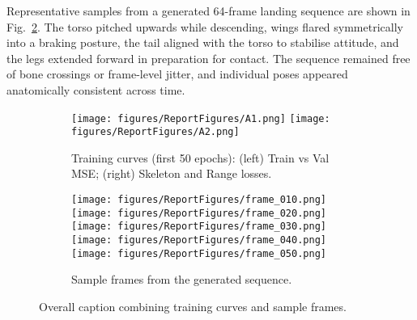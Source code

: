 \documentclass[final-report]{report-template}
\begin{document}
Representative samples from a generated 64-frame landing sequence are shown in Fig.~\ref{fig:bottom_five}. 
The torso pitched upwards while descending, wings flared symmetrically into a braking posture, the tail aligned with the torso to stabilise attitude, and the legs extended forward in preparation for contact. 
The sequence remained free of bone crossings or frame-level jitter, and individual poses appeared anatomically consistent across time.



\begin{figure}[H]
\centering

  \begin{subfigure}[t]{0.95\textwidth}
    \centering
    \texttt{[image: figures/ReportFigures/A1.png]}
    \hfill
    \texttt{[image: figures/ReportFigures/A2.png]}
    \caption{Training curves (first 50 epochs): 
    (left) Train vs Val MSE; (right) Skeleton and Range losses.}
    \label{fig:train_curves}
  \end{subfigure}

\vspace{0.9em}

\begin{subfigure}[t]{\textwidth}
  \centering
  \begin{minipage}{0.8\textwidth}
    \centering
    \texttt{[image: figures/ReportFigures/frame\_010.png]}\hfill
    \texttt{[image: figures/ReportFigures/frame\_020.png]}\hfill
    \texttt{[image: figures/ReportFigures/frame\_030.png]}\hfill
    \texttt{[image: figures/ReportFigures/frame\_040.png]}\hfill
    \texttt{[image: figures/ReportFigures/frame\_050.png]}
  \end{minipage}

  \caption{Sample frames from the generated sequence.}
  \label{fig:bottom_five}
\end{subfigure}


\caption{Overall caption combining training curves and sample frames.}
\label{fig:combined_onefigure}
\end{figure}


\end{document}
